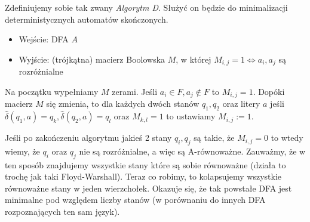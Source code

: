 Zdefiniujemy sobie tak zwany \textit{Algorytm D}. Służyć on będzie do minimalizacji deterministycznych automatów skończonych.

\begin{itemize}
	\item Wejście: DFA \( A \)
	\item Wyjście: (trójkątna) macierz Boolowska \( M \), w której \( M_{i, j} = 1 \iff a_i, a_j \) są rozróżnialne
\end{itemize}

Na początku wypełniamy \( M \) zerami.
Jeśli \( a_i \in F, a_j \notin F \) to \( M_{i, j} = 1 \).
Dopóki macierz \( M \) się zmienia, to dla każdych dwóch stanów \( q_1, q_2 \) oraz litery \( a \) jeśli \( \hat \delta(q_1, a) = q_k, \hat \delta(q_2, a) = q_l \) oraz \( M_{k, l} = 1 \) to ustawiamy \( M_{i, j} := 1 \).

Jeśli po zakończeniu algorytmu jakieś 2 stany \(q_i, q_j\) są takie, że \(M_{i,j} = 0\) to wtedy wiemy, że \(q_i\) oraz \(q_j\) nie są rozróżnialne, a więc są A-równoważne. Zauważmy, że w ten sposób znajdujemy wszystkie stany które są sobie równoważne (działa to trochę jak taki Floyd-Warshall). Teraz co robimy, to kolapsujemy wszystkie równoważne stany w jeden wierzchołek. Okazuje się, że tak powstałe DFA jest minimalne pod względem liczby stanów (w porównaniu do innych DFA rozpoznających ten sam język).

